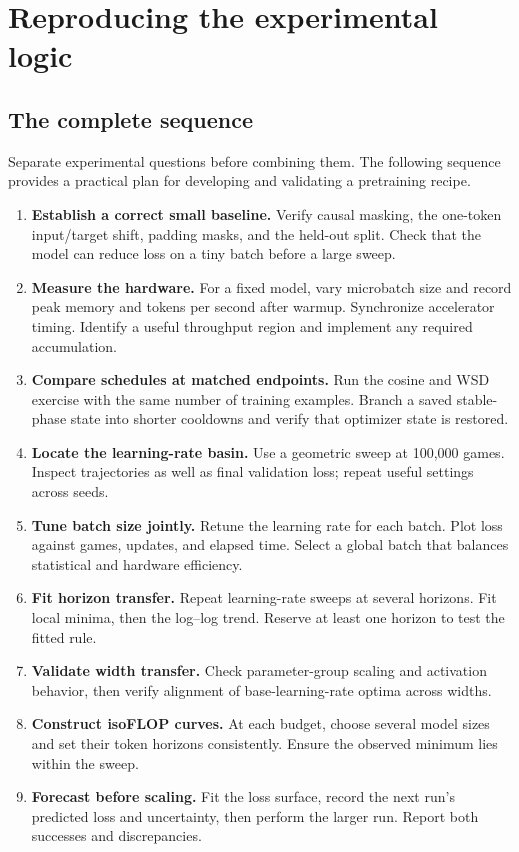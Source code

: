 \chapter{Reproducing the experimental logic}
\label{ch:practice}

\section{The complete sequence}
Separate experimental questions before combining them. The following sequence provides a practical plan for developing and validating a pretraining recipe.

\begin{enumerate}
\item \textbf{Establish a correct small baseline.} Verify causal masking, the one-token input/target shift, padding masks, and the held-out split. Check that the model can reduce loss on a tiny batch before a large sweep.
\item \textbf{Measure the hardware.} For a fixed model, vary microbatch size and record peak memory and tokens per second after warmup. Synchronize accelerator timing. Identify a useful throughput region and implement any required accumulation.
\item \textbf{Compare schedules at matched endpoints.} Run the cosine and WSD exercise with the same number of training examples. Branch a saved stable-phase state into shorter cooldowns and verify that optimizer state is restored.
\item \textbf{Locate the learning-rate basin.} Use a geometric sweep at 100,000 games. Inspect trajectories as well as final validation loss; repeat useful settings across seeds.
\item \textbf{Tune batch size jointly.} Retune the learning rate for each batch. Plot loss against games, updates, and elapsed time. Select a global batch that balances statistical and hardware efficiency.
\item \textbf{Fit horizon transfer.} Repeat learning-rate sweeps at several horizons. Fit local minima, then the log--log trend. Reserve at least one horizon to test the fitted rule.
\item \textbf{Validate width transfer.} Check parameter-group scaling and activation behavior, then verify alignment of base-learning-rate optima across widths.
\item \textbf{Construct isoFLOP curves.} At each budget, choose several model sizes and set their token horizons consistently. Ensure the observed minimum lies within the sweep.
\item \textbf{Forecast before scaling.} Fit the loss surface, record the next run's predicted loss and uncertainty, then perform the larger run. Report both successes and discrepancies.
\end{enumerate}

